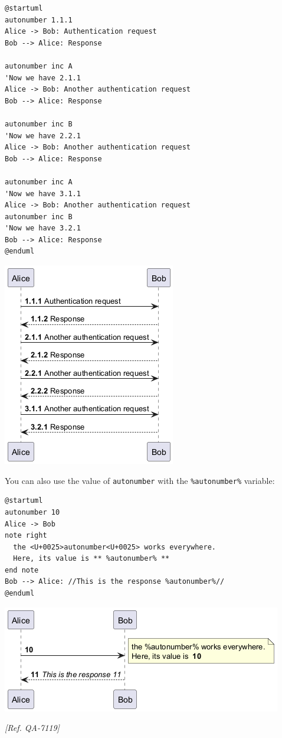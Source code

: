 \begin{verbatim}
@startuml
autonumber 1.1.1
Alice -> Bob: Authentication request
Bob --> Alice: Response

autonumber inc A
'Now we have 2.1.1
Alice -> Bob: Another authentication request
Bob --> Alice: Response

autonumber inc B
'Now we have 2.2.1
Alice -> Bob: Another authentication request
Bob --> Alice: Response

autonumber inc A
'Now we have 3.1.1
Alice -> Bob: Another authentication request
autonumber inc B
'Now we have 3.2.1
Bob --> Alice: Response
@enduml
\end{verbatim}
\begin{center}
\includegraphics[scale=0.60]{imgw/img-3dac4e03bb423dab957803c7b32e00e1.png}
\end{center}




You can also use the value of \texttt{autonumber} with the \texttt{\%autonumber\%} variable:
\begin{verbatim}
@startuml
autonumber 10
Alice -> Bob
note right
  the <U+0025>autonumber<U+0025> works everywhere.
  Here, its value is ** %autonumber% **
end note
Bob --> Alice: //This is the response %autonumber%//
@enduml
\end{verbatim}
\begin{center}
\includegraphics[scale=0.60]{imgw/img-c76b3f88f668a16c13d51dc9c439b1a1.png}
\end{center}
\textit{[Ref. QA-7119]}
%
%
